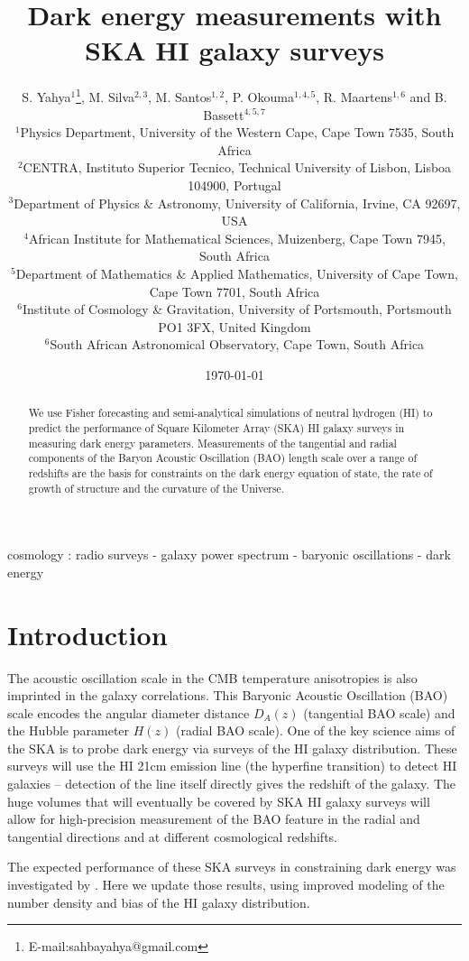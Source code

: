 \documentclass[useAMS,usenatbib]{mn2e}
\title[Dark energy measurements with SKA HI Galaxy Surveys]{Dark energy measurements with  SKA HI galaxy surveys}
\author[S. Yahya, M. Silva, M. Santos, P. Okouma, R. Maartens and B. Bassett ]{S. Yahya$^{1}$\footnotemark[0]\thanks{E-mail:sahbayahya@gmail.com},  M. Silva$^{2,3}$, M. Santos$^{1,2}$, P. Okouma$^{1,4,5}$,
 \newauthor  R. Maartens$^{1,6}$ and B. Bassett$^{4,5,7}$
\\
$^{1}$Physics Department, University of the Western Cape, Cape Town 7535, South Africa\\
$^{2}$CENTRA, Instituto Superior Tecnico, Technical University of Lisbon, Lisboa 104900, Portugal\\
$^{3}$Department of Physics \& Astronomy, University of California, Irvine, CA 92697, USA\\
$^{4}$African Institute for Mathematical Sciences, Muizenberg, Cape Town 7945, South Africa\\
$^{5}$Department of Mathematics \& Applied Mathematics, University of Cape Town, Cape Town 7701, South Africa\\
$^{6}$Institute of Cosmology \& Gravitation, University of Portsmouth, Portsmouth PO1 3FX, United Kingdom\\
$^{6}$South African Astronomical Observatory, Cape Town, South Africa
}
\begin{document}
\date{\today}

\pagerange{\pageref{firstpage}--\pageref{lastpage}} 

\maketitle

\label{firstpage}
\begin{abstract}
We use Fisher forecasting and semi-analytical simulations of neutral hydrogen (HI) to predict the performance of Square Kilometer Array (SKA) HI galaxy surveys in measuring dark energy parameters.
Measurements of the tangential and radial components of the Baryon Acoustic Oscillation (BAO) length scale over a range of redshifts are the basis for constraints on the dark energy equation of state, the rate of growth of structure and the curvature of the Universe. 
\end{abstract}

\begin{keywords}
cosmology : radio surveys - galaxy power spectrum - baryonic oscillations
- dark energy
\end{keywords}


\section{Introduction}

The acoustic oscillation scale  in the CMB temperature anisotropies is also imprinted in the galaxy correlations. This Baryonic  Acoustic Oscillation (BAO) scale encodes the angular diameter distance $D_A(z)$ (tangential BAO scale) and the Hubble parameter $H(z)$ (radial BAO scale).
One of the key science aims of the SKA is to probe dark energy via surveys of the HI galaxy distribution. These surveys will use the HI 21cm emission line (the hyperfine transition) to detect HI galaxies -- detection of the line itself directly gives the redshift of the galaxy. The huge volumes that will eventually be covered by SKA HI galaxy surveys will allow for high-precision measurement of the BAO feature in the radial and tangential directions and at different cosmological redshifts.

The expected performance of these SKA surveys in constraining dark energy was investigated by  \citep{Abdalla:2009wr}. Here we update those results, using improved modeling of the number density and bias of the HI galaxy distribution. 
\end{document}
